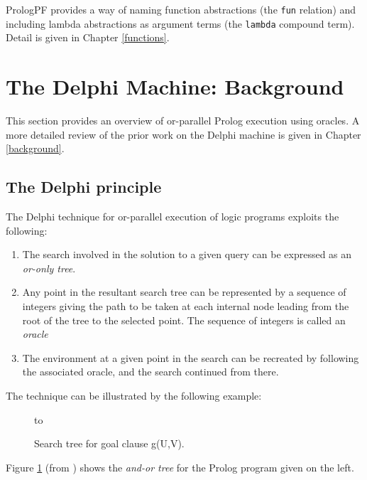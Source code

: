 PrologPF provides a way of naming function abstractions (the \texttt{fun}
relation) and including lambda abstractions as argument terms (the 
\texttt{lambda} compound term).  Detail is given in Chapter \ref{functions}.

\section{The Delphi Machine: Background} %
\label{delphi_background}

This section provides an overview of or-parallel Prolog execution
using oracles.  A more detailed review of the prior work on the
Delphi machine is given in Chapter \ref{background}.

\subsection{The Delphi principle}

The Delphi technique for or-parallel execution of logic programs
exploits the following:
\begin{enumerate}
\item{The search involved in the solution to a given query can
  be expressed as an \textit{or-only tree}.}
\item{Any point in the resultant search tree can be represented by
  a sequence of integers giving the path to be taken at each internal
  node leading from the root of the tree to the selected point.
  The sequence of integers is called an \textit{oracle}}
\item{The environment at a given point in the search can be
  recreated by following the associated oracle, and the search continued
  from there.}
\end{enumerate}

The technique can be illustrated by the following example:

\begin{figure}[h]
\vspace{5mm} \hbox to 
\caption{Search tree for goal clause g(U,V).}
\vspace{5mm}
\label{and_or_tree}
\end{figure}

Figure \ref{and_or_tree} (from \cite{CA87}) shows the \textit{and-or tree} for
the Prolog program given on the left.

